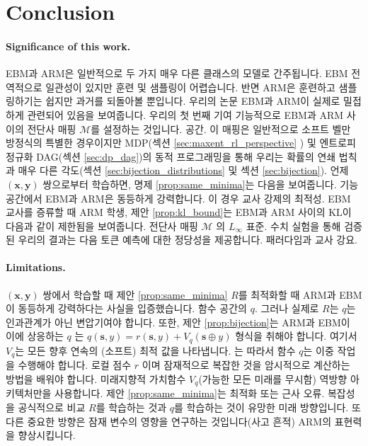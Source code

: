 \documentclass{article}
\def\s{{\bm{s}}}
\def\x{{\bm{x}}}
\def\y{{\bm{y}}}
\def\cM{{\mathcal{M}}}
\begin{document}
\section{Conclusion}

\paragraph{Significance of this work.}

EBM과 ARM은 일반적으로 두 가지 매우 다른 클래스의 모델로 간주됩니다.  EBM
전역적으로 일관성이 있지만 훈련 및 샘플링이 어렵습니다. 반면 ARM은
훈련하고 샘플링하기는 쉽지만 과거를 되돌아볼 뿐입니다.  우리의 논문
EBM과 ARM이 실제로 밀접하게 관련되어 있음을 보여줍니다.  우리의 첫 번째 기여
기능적으로 EBM과 ARM 사이의 전단사 매핑 $\cM$를 설정하는 것입니다.
공간.  이 매핑은 일반적으로 소프트 벨만 방정식의 특별한 경우이지만
MDP(섹션 \ref{sec:maxent_rl_perspective} ) 및 엔트로피 정규화
DAG(섹션 \ref{sec:dp_dag})의 동적 프로그래밍을 통해 우리는
확률의 연쇄 법칙과 매우 다른 각도(섹션
 \ref{sec:bijection_distributions} 및 섹션 \ref{sec:bijection}).  언제
$(\x, \y)$ 쌍으로부터 학습하면, 명제 \ref{prop:same_minima}는 다음을 보여줍니다.
기능 공간에서 EBM과 ARM은 동등하게 강력합니다.
이 경우 교사 강제의 최적성.  EBM 교사를 증류할 때
ARM 학생, 
제안
 \ref{prop:kl_bound}는 EBM과 ARM 사이의 KL이 다음과 같이 제한됨을 보여줍니다.
전단사 매핑 $\cM$ 의 $L_\infty$ 표준.
수치 실험을 통해 검증된 우리의 결과는
다음 토큰 예측에 대한 정당성을 제공합니다.
패러다임과 교사 강요.

\paragraph{Limitations.}

$(\x, \y)$ 쌍에서 학습할 때 제안 \ref{prop:same_minima} 
$R$를 최적화할 때 ARM과 EBM이 동등하게 강력하다는 사실을 입증했습니다.
 함수 공간의 $q$. 그러나 실제로 $R$는
$q$는 인과관계가 아닌 변압기여야 합니다.  또한, 제안
 \ref{prop:bijection}는 ARM과 EBM이
이에 상응하는 $q$ 는 $q(\s, y) = r(\s, y) + V_q(\s \oplus y)$ 형식을 취해야 합니다.
여기서 $V_q$는 모든 향후 연속의 (소프트) 최적 값을 나타냅니다. 는
따라서 함수 $q$는 이중 작업을 수행해야 합니다.
로컬 점수 $r$ 이며 잠재적으로 복잡한 것을 암시적으로 계산하는 방법을 배워야 합니다.
미래지향적 가치함수 $V_q$(가능한 모든 미래를 무시함)
역방향 아키텍처만을 사용합니다.  
제안 \ref{prop:same_minima}는 최적화 또는
근사 오류.
복잡성을 공식적으로 비교
$R$를 학습하는 것과 $q$를 학습하는 것이 유망한 미래 방향입니다.
또 다른 중요한 방향은 잠재 변수의 영향을 연구하는 것입니다(사고
흔적) ARM의 표현력을 향상시킵니다.
\end{document}
